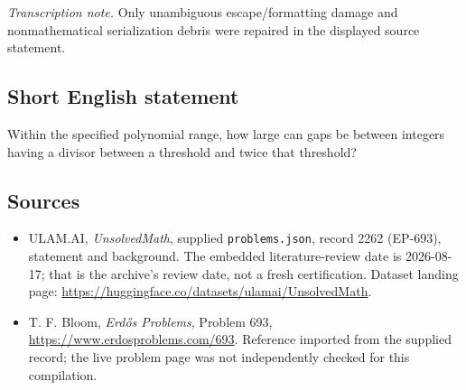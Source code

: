 \documentclass[11pt,a4paper]{article}
\begin{document}
{\small\emph{Transcription note.} Only unambiguous escape/formatting damage and nonmathematical serialization debris were repaired in the displayed source statement.}

\subsection{Short English statement}

Within the specified polynomial range, how large can gaps be between integers having a divisor between a threshold and twice that threshold?

\subsection{Sources}

{\small

\begin{itemize}

\item[\hypertarget{source:2262:1}{S1}] ULAM.AI, \emph{UnsolvedMath}, supplied \texttt{problems.json}, record 2262 (EP-693), statement and background. The embedded literature-review date is 2026-08-17; that is the archive’s review date, not a fresh certification. Dataset landing page: \url{https://huggingface.co/datasets/ulamai/UnsolvedMath}.

\item[\hypertarget{source:2262:2}{S2}] T. F. Bloom, \emph{Erdős Problems}, Problem 693, \url{https://www.erdosproblems.com/693}. Reference imported from the supplied record; the live problem page was not independently checked for this compilation.

\end{itemize}

}

\label{end:2262}
\end{document}
